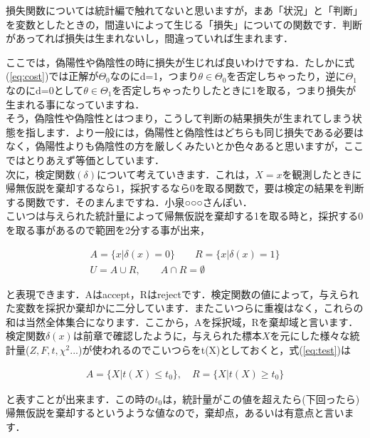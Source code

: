 \documentclass[11pt,a4paper,uplatex]{ujreport} 	%
\begin{document}
損失関数については統計編で触れてないと思いますが，まあ「状況」と「判断」を変数としたときの，間違いによって生じる「損失」についての関数です．判断があってれば損失は生まれないし，間違っていれば生まれます．

ここでは，偽陽性や偽陰性の時に損失が生じれば良いわけですね．たしかに式(\ref{eq:cost})では正解が$\Theta_0$なのにd=1，つまり$\theta \in \Theta_0$を否定しちゃったり，逆に$\Theta_1$なのにd=0として$\theta \in \Theta_1$を否定しちゃったりしたときに1を取る，つまり損失が生まれる事になっていますね．\\

そう，偽陰性や偽陰性とはつまり，こうして判断の結果損失が生まれてしまう状態を指します．より一般には，偽陽性と偽陰性はどちらも同じ損失である必要はなく，偽陽性よりも偽陰性の方を厳しくみたいとか色々あると思いますが，ここではとりあえず等価としています．\\

次に，検定関数$(\delta)$について考えていきます．これは，$X=x$を観測したときに帰無仮説を棄却するなら$1$，採択するなら$0$を取る関数で，要は検定の結果を判断する関数です．そのまんまですね．小泉○○○さんぽい．\\

こいつは与えられた統計量によって帰無仮説を棄却する1を取る時と，採択する0を取る事があるので範囲を2分する事が出来，

\begin{align}
  A = \{x| \delta(x) = 0\} \qquad R = \{x| \delta(x) = 1  \}\label{eq:test}\\
  U = A\cup R,\qquad A \cap R = \emptyset
\end{align}

と表現できます．Aはaccept，Rはrejectです．検定関数の値によって，与えられた変数を採択か棄却かに二分しています．またこいつらに重複はなく，これらの和は当然全体集合になります．ここから，Aを採択域，Rを棄却域と言います．\\

検定関数$\delta(x)$は前章で確認したように，与えられた標本$X$を元にした様々な統計量($Z,F,t,\chi^2...$)が使われるのでこいつらをt(X)としておくと，式(\ref{eq:test})は

\begin{align}
  A = \{X|t(X) \leq t_0\}, \quad R = \{X|t(X) \geq t_0\}
\end{align}

と表すことが出来ます．この時の$t_0$は，統計量がこの値を超えたら(下回ったら)帰無仮説を棄却するというような値なので，棄却点，あるいは有意点と言います．\\
\end{document}
